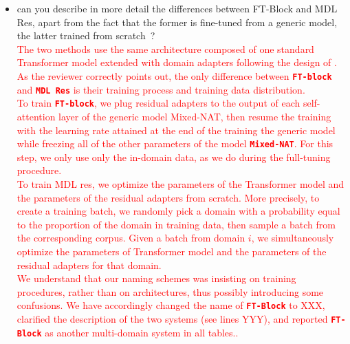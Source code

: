 \documentclass[12pt,times,a4paper,twoside]{article}
\newcommand{\fyTodo}[1]{\Todo[FY:]{\textcolor{orange}{#1}}}
\theoremstyle{definition}
\newcommand{\system}[1]{\texttt{\textbf{#1}}}
\begin{document}
\begin{itemize}
\item can you describe in more detail the differences between FT-Block and MDL Res, apart from the fact that the former is fine-tuned from a generic model, the latter trained from scratch~?
  \\
  \textcolor{red}{%
    The two methods use the same architecture composed of one standard Transformer model extended with domain adapters following the design of \cite{Bapna19simple}. As the reviewer correctly points out, the only difference between \system{FT-block} and \system{MDL Res} is their training process and training data distribution.
    \\
    To train \system{FT-block}, we plug residual adapters to the output of each self-attention layer of the generic model Mixed-NAT, then resume the training with the learning rate attained at the end of the training the generic model while freezing all of the other parameters of the model \system{Mixed-NAT}. For this step, we only use only the in-domain data, as we do during the full-tuning procedure.
    \\
    To train MDL res, we optimize the parameters of the Transformer model and the parameters of the residual adapters from scratch. More precisely, to create a training batch, we randomly pick a domain with a probability equal to the proportion of the domain in training data, then sample a batch from the corresponding corpus. Given a batch from domain $i$, we simultaneously optimize the parameters of Transformer model and the parameters of the residual adapters for that domain.
    \\
    We understand that our naming schemes was insisting on training procedures, rather than on architectures, thus possibly introducing some confusions. We have accordingly changed the name of \system{FT-Block} to XXX\fyTodo{fix this}, clarified the description of the two systems (see lines YYY\fyTodo{fix this}), and reported \system{FT-Block}\fyTodo{or new name} as another multi-domain system in all tables.\fyTodo{Make sure it is the case}.}
\end{itemize}
\end{document}
